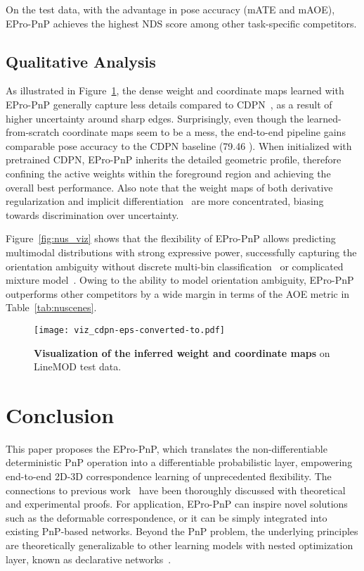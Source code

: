 \documentclass[10pt,twocolumn,letterpaper]{article}
\begin{document}
On the test data, with the advantage in pose accuracy (mATE and mAOE), EPro-PnP achieves the highest NDS score among other task-specific competitors.

\subsection{Qualitative Analysis}

As illustrated in Figure~\ref{fig:cdpn_viz}, the dense weight and coordinate maps learned with EPro-PnP generally capture less details compared to CDPN~\cite{CDPN}, as a result of higher uncertainty around sharp edges. Surprisingly, even though the learned-from-scratch coordinate maps seem to be a mess, the end-to-end pipeline gains comparable pose accuracy to the CDPN baseline (79.46 ). When initialized with pretrained CDPN, EPro-PnP inherits the detailed geometric profile, therefore confining the active weights within the foreground region and achieving the overall best performance. Also note that the weight maps of both derivative regularization and implicit differentiation~\cite{BPnP} are more concentrated, biasing towards discrimination over uncertainty.

Figure~\ref{fig:nus_viz} shows that the flexibility of EPro-PnP allows predicting multimodal distributions with strong expressive power, successfully capturing the orientation ambiguity without discrete multi-bin classification~\cite{fcos3d,mousavian20173d} or complicated mixture model~\cite{bui20206d}. Owing to the ability to model orientation ambiguity, EPro-PnP outperforms other competitors by a wide margin in terms of the AOE metric in Table~\ref{tab:nuscenes}.

\begin{figure}[t]
\vspace*{-3.5ex}
\begin{center}
\hspace{-4mm}\texttt{[image: viz\_cdpn-eps-converted-to.pdf]}
\end{center}
\vspace*{-2mm}
\caption{\textbf{Visualization of the inferred weight and coordinate maps} on LineMOD test data.} 
\label{fig:cdpn_viz}
\end{figure}

\section{Conclusion}

This paper proposes the EPro-PnP, which translates the non-differentiable deterministic PnP operation into a differentiable probabilistic layer, empowering end-to-end 2D-3D correspondence learning of unprecedented flexibility. The connections to previous work~\cite{monorun,BPnP,blindpnp,dsac++} have been thoroughly discussed with theoretical and experimental proofs. For application, EPro-PnP can inspire novel solutions such as the deformable correspondence, or it can be simply integrated into existing PnP-based networks.
Beyond the PnP problem, the underlying principles are theoretically generalizable to other learning models with nested optimization layer, known as declarative networks~\cite{declarative}.
\end{document}
